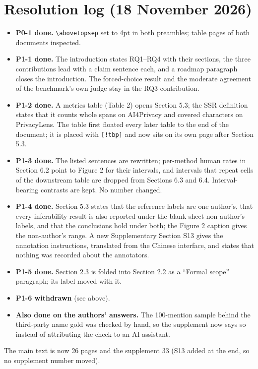 \documentclass[10pt]{article}
\begin{document}
\section{Resolution log (18 November 2026)}
\begin{itemize}
\item \textbf{P0-1 done.} \verb|\abovetopsep| set to 4pt in both preambles; table pages of both documents inspected.
\item \textbf{P1-1 done.} The introduction states RQ1--RQ4 with their sections, the three contributions lead with a
claim sentence each, and a roadmap paragraph closes the introduction. The forced-choice result and the moderate
agreement of the benchmark's own judge stay in the RQ3 contribution.
\item \textbf{P1-2 done.} A metrics table (Table 2) opens Section 5.3; the SSR definition states that it counts whole
spans on AI4Privacy and covered characters on PrivacyLens. The table first floated every later table to the end of
the document; it is placed with \verb|[!tbp]| and now sits on its own page after Section 5.3.
\item \textbf{P1-3 done.} The listed sentences are rewritten; per-method human rates in Section 6.2 point to
Figure 2 for their intervals, and intervals that repeat cells of the downstream table are dropped from Sections 6.3
and 6.4. Interval-bearing contrasts are kept. No number changed.
\item \textbf{P1-4 done.} Section 5.3 states that the reference labels are one author's, that every inferability
result is also reported under the blank-sheet non-author's labels, and that the conclusions hold under both; the
Figure 2 caption gives the non-author's range. A new Supplementary Section S13 gives the annotation instructions,
translated from the Chinese interface, and states that nothing was recorded about the annotators.
\item \textbf{P1-5 done.} Section 2.3 is folded into Section 2.2 as a ``Formal scope'' paragraph; its label moved
with it.
\item \textbf{P1-6 withdrawn} (see above).
\item \textbf{Also done on the authors' answers.} The 100-mention sample behind the third-party name gold was
checked by hand, so the supplement now says so instead of attributing the check to an AI assistant.
\end{itemize}
The main text is now 26 pages and the supplement 33 (S13 added at the end, so no supplement number moved).
\end{document}
